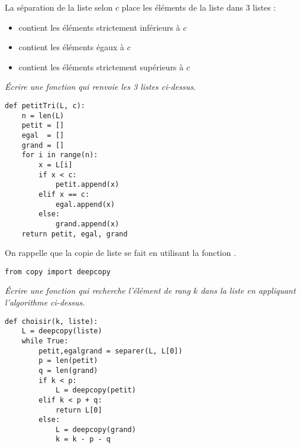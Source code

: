 La séparation de la liste selon $c$ place les éléments de la liste  dans 3 listes :
\begin{itemize}
    \item {} contient les éléments  strictement inférieurs à $c$
    \item {} contient les éléments  égaux à $c$
    \item {} contient les éléments  strictement supérieurs à $c$
\end{itemize}
\begin{Exercise}\it Écrire une fonction  qui renvoie les 3 listes ci-dessus.
\end{Exercise} 
\begin{Answer} 
\begin{lstlisting}
def petitTri(L, c):
    n = len(L)
    petit = []
    egal  = []
    grand = []
    for i in range(n):
        x = L[i]
        if x < c:
            petit.append(x)
        elif x == c:
            egal.append(x)
        else:
            grand.append(x)
    return petit, egal, grand    
\end{lstlisting}
\newpage
\end{Answer}
On rappelle que la copie de liste se fait en utilisant la fonction .
\begin{lstlisting}
from copy import deepcopy
\end{lstlisting}
\begin{Exercise}\it Écrire une fonction  qui  recherche l'élément de rang $k$ dans la liste en appliquant l'algorithme ci-dessus.
\end{Exercise} 
\begin{Answer} 
\begin{lstlisting}
def choisir(k, liste):
    L = deepcopy(liste)
    while True:
        petit,egalgrand = separer(L, L[0])
        p = len(petit)
        q = len(grand)
        if k < p:
            L = deepcopy(petit)
        elif k < p + q:
            return L[0]
        else:
            L = deepcopy(grand)
            k = k - p - q 
\end{lstlisting}
\end{Answer}
